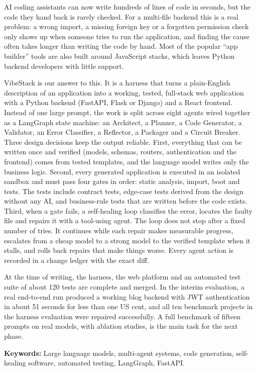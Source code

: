 \documentclass[12pt,a4paper]{report}
\begin{document}
AI coding assistants can now write hundreds of lines of code in seconds, but the code they hand back is rarely checked. For a multi-file backend this is a real problem: a wrong import, a missing foreign key or a forgotten permission check only shows up when someone tries to run the application, and finding the cause often takes longer than writing the code by hand. Most of the popular ``app builder'' tools are also built around JavaScript stacks, which leaves Python backend developers with little support.

VibeStack is our answer to this. It is a harness that turns a plain-English description of an application into a working, tested, full-stack web application with a Python backend (FastAPI, Flask or Django) and a React frontend. Instead of one large prompt, the work is split across eight agents wired together as a LangGraph state machine: an Architect, a Planner, a Code Generator, a Validator, an Error Classifier, a Reflector, a Packager and a Circuit Breaker. Three design decisions keep the output reliable. First, everything that can be written once and verified (models, schemas, routers, authentication and the frontend) comes from tested templates, and the language model writes only the business logic. Second, every generated application is executed in an isolated sandbox and must pass four gates in order: static analysis, import, boot and tests. The tests include contract tests, edge-case tests derived from the design without any AI, and business-rule tests that are written before the code exists. Third, when a gate fails, a self-healing loop classifies the error, locates the faulty file and repairs it with a tool-using agent. The loop does not stop after a fixed number of tries. It continues while each repair makes measurable progress, escalates from a cheap model to a strong model to the verified template when it stalls, and rolls back repairs that make things worse. Every agent action is recorded in a change ledger with the exact diff.

At the time of writing, the harness, the web platform and an automated test suite of about 120 tests are complete and merged. In the interim evaluation, a real end-to-end run produced a working blog backend with JWT authentication in about 51 seconds for less than one US cent, and all ten benchmark projects in the harness evaluation were repaired successfully. A full benchmark of fifteen prompts on real models, with ablation studies, is the main task for the next phase.

\vspace{0.5cm}
\noindent\textbf{Keywords:} Large language models, multi-agent systems, code generation, self-healing software, automated testing, LangGraph, FastAPI.
\end{document}
